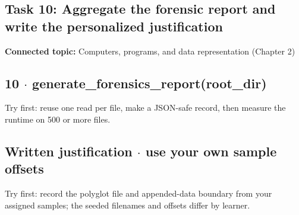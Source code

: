 \documentclass[11pt]{article}
\begin{document}
\begin{keepsection}
\section{Task 10: Aggregate the forensic report and write the personalized justification}

\textbf{Connected topic:} Computers, programs, and data representation (Chapter 2)

\begin{keepsection}
\subsection{10 \ensuremath{\cdot} generate\_forensics\_report(root\_dir)}

Try first: reuse one read per file, make a JSON-safe record, then measure the runtime on 500 or more files.

\end{keepsection}

\begin{keepsection}
\subsection{Written justification \ensuremath{\cdot} use your own sample offsets}

Try first: record the polyglot file and appended-data boundary from your assigned samples; the seeded filenames and offsets differ by learner.

\end{keepsection}
\end{keepsection}


\clearpage
\end{document}
